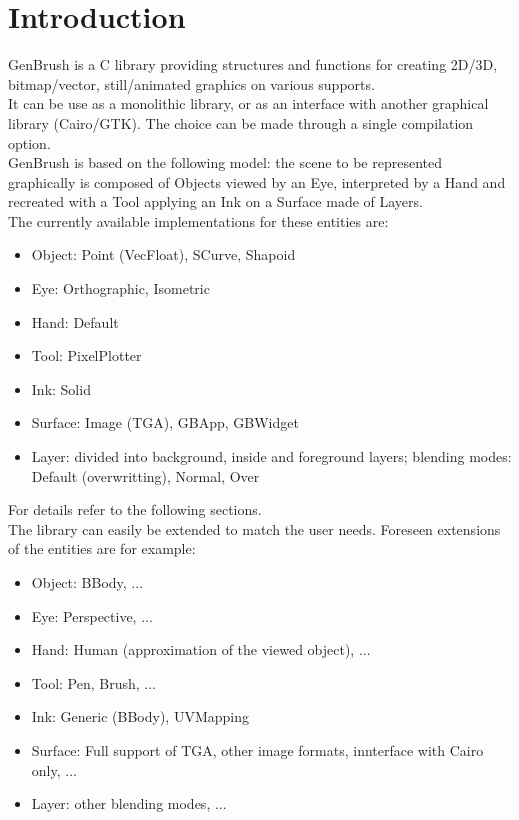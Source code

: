 \section*{Introduction}

GenBrush is a C library providing structures and functions for creating 2D/3D, bitmap/vector, still/animated graphics on various supports.\\

It can be use as a monolithic library, or as an interface with another graphical library (Cairo/GTK). The choice can be made through a single compilation option.\\

GenBrush is based on the following model: the scene to be represented graphically is composed of Objects viewed by an Eye, interpreted by a Hand and recreated with a Tool applying an Ink on a Surface made of Layers.\\

The currently available implementations for these entities are:\\
\begin{itemize}
\item Object: Point (VecFloat), SCurve, Shapoid
\item Eye: Orthographic, Isometric
\item Hand: Default
\item Tool: PixelPlotter
\item Ink: Solid
\item Surface: Image (TGA), GBApp, GBWidget
\item Layer: divided into background, inside and foreground layers; blending modes: Default (overwritting), Normal, Over
\end{itemize}
For details refer to the following sections.\\

The library can easily be extended to match the user needs. Foreseen extensions of the entities are for example:\\
\begin{itemize}
\item Object: BBody, ...
\item Eye: Perspective, ...
\item Hand: Human (approximation of the viewed object), ...
\item Tool: Pen, Brush, ...
\item Ink: Generic (BBody), UVMapping
\item Surface: Full support of TGA, other image formats, innterface with Cairo only, ...
\item Layer: other blending modes, ...
\end{itemize}

